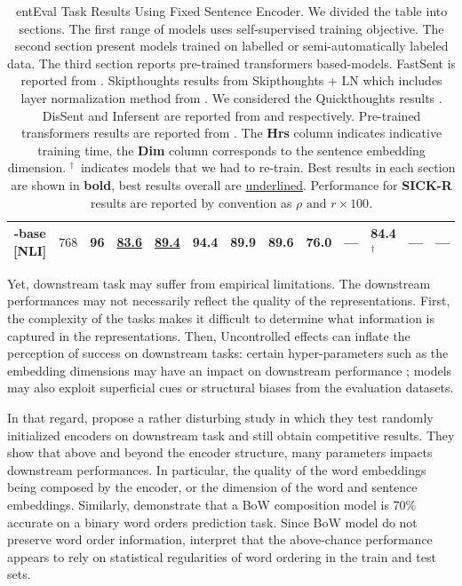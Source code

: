 \begin{table}[!htb]
\begin{tabularx}{16cm}{@{}c c Y | Y Y Y Y Y Y Y Y Y Y @{}}
-base [NLI] & $768$ & 96 & \textbf{\underline{83.6}} & \textbf{\underline{89.4}} & \textbf{94.4} & \textbf{89.9} & 89.6 & \textbf{76.0} & --- & \textbf{84.4}$^\dagger$ & --- & ---\\
\bottomrule
\end{tabularx}
\caption{entEval Task Results Using Fixed Sentence Encoder.
We divided the table into sections. The first range of models uses self-supervised training objective. The second section present models trained on labelled or semi-automatically labeled data. The third section reports pre-trained transformers based-models. FastSent is reported from \textcite{hill_16}. Skipthoughts results from \parencite{kiros_15} Skipthoughts + LN which includes layer normalization method from \textcite{ba_16}. We considered the Quickthoughts results \parencite{logeswaran_18}. DisSent and Infersent are reported from \textcite{nie_19} and \textcite{conneau_17} respectively. Pre-trained transformers results are reported from \textcite{reimers_19}. The \textbf{Hrs} column indicates indicative training time, the \textbf{Dim} column corresponds to the sentence embedding dimension. $^\dagger$\, indicates models that we had to re-train. Best results in each section are shown in \textbf{bold}, best results overall are \underline{underlined}. Performance for \textbf{SICK-R} results are reported by convention as $\rho \text{ and } r \times 100$.}
\end{table}

Yet, downstream task may suffer from empirical limitations. The downstream performances may not necessarily reflect the quality of the representations. First, the complexity of the tasks makes it difficult to determine what information is captured in the representations. Then, Uncontrolled effects can inflate the perception of success on downstream tasks: certain hyper-parameters such as the embedding dimensions may have an impact on downstream performance ; models may also exploit superficial cues or structural biases from the evaluation datasets.

In that regard, \textcite{wieting_19} propose a rather disturbing study in which they test randomly initialized encoders on downstream task and still obtain competitive results. They show that above and beyond the encoder structure, many parameters impacts downstream performances. In particular, the quality of the word embeddings being composed by the encoder, or the dimension of the word and sentence embeddings. Similarly, \textcite{adi_17} demonstrate that a BoW composition model is 70\% accurate on a binary word orders prediction task. Since BoW model do not preserve word order information, \textcite{ettinger_18} interpret that the above-chance performance appears to rely on statistical regularities of word ordering in the train and test sets.

